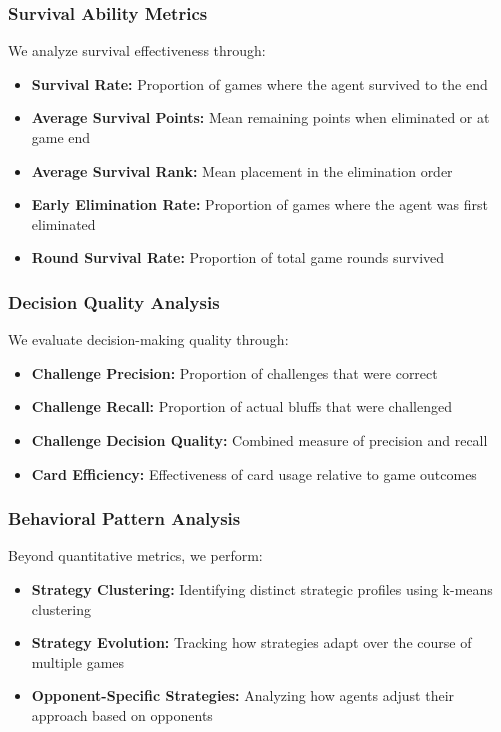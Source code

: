 \documentclass{article}
\begin{document}
\subsubsection{Survival Ability Metrics}
We analyze survival effectiveness through:
\begin{itemize}
    \item \textbf{Survival Rate:} Proportion of games where the agent survived to the end
    \item \textbf{Average Survival Points:} Mean remaining points when eliminated or at game end
    \item \textbf{Average Survival Rank:} Mean placement in the elimination order
    \item \textbf{Early Elimination Rate:} Proportion of games where the agent was first eliminated
    \item \textbf{Round Survival Rate:} Proportion of total game rounds survived
\end{itemize}

\subsubsection{Decision Quality Analysis}
We evaluate decision-making quality through:
\begin{itemize}
    \item \textbf{Challenge Precision:} Proportion of challenges that were correct
    \item \textbf{Challenge Recall:} Proportion of actual bluffs that were challenged
    \item \textbf{Challenge Decision Quality:} Combined measure of precision and recall
    \item \textbf{Card Efficiency:} Effectiveness of card usage relative to game outcomes
\end{itemize}

\subsubsection{Behavioral Pattern Analysis}
Beyond quantitative metrics, we perform:
\begin{itemize}
    \item \textbf{Strategy Clustering:} Identifying distinct strategic profiles using k-means clustering
    \item \textbf{Strategy Evolution:} Tracking how strategies adapt over the course of multiple games
    \item \textbf{Opponent-Specific Strategies:} Analyzing how agents adjust their approach based on opponents
\end{itemize}
\end{document}
